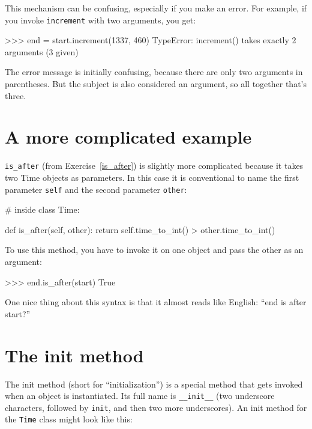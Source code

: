 This mechanism can be confusing, especially if you make an error.
For example, if you invoke {\tt increment} with two arguments, you
get:


\beforeverb
\begin{pyinterpreter}
>>> end = start.increment(1337, 460)
TypeError: increment() takes exactly 2 arguments (3 given)
\end{pyinterpreter}
\afterverb
%
The error message is initially confusing, because there are
only two arguments in parentheses.  But the subject is also
considered an argument, so all together that's three.


\section{A more complicated example}

\verb"is_after" (from Exercise~\ref{is_after}) is slightly more complicated
because it takes two Time objects as parameters.  In this case it is
conventional to name the first parameter {\tt self} and the second
parameter {\tt other}:


\beforeverb
\begin{pycode}
# inside class Time:

    def is_after(self, other):
        return self.time_to_int() > other.time_to_int()
\end{pycode}
\afterverb
%
To use this method, you have to invoke it on one object and pass
the other as an argument:

\beforeverb
\begin{pyinterpreter}
>>> end.is_after(start)
True
\end{pyinterpreter}
\afterverb
%
One nice thing about this syntax is that it almost reads
like English: ``end is after start?''


\section{The init method}


The init method (short for ``initialization'') is
a special method that gets invoked when an object is instantiated.  
Its full name is \verb"__init__" (two underscore characters,
followed by {\tt init}, and then two more underscores).  An
init method for the {\tt Time} class might look like this:

